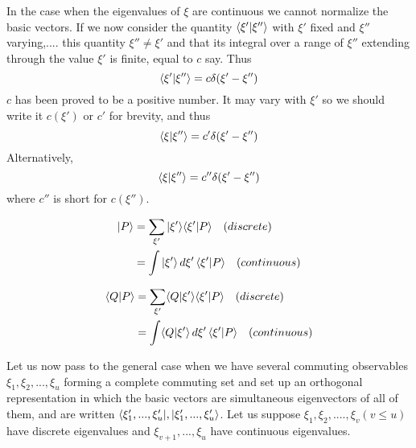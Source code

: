 In the case when the eigenvalues of $\xi$ are continuous we cannot normalize the basic vectors. If we now consider the quantity $\langle \xi' | \xi'' \rangle$ with $\xi'$ fixed and $\xi''$ varying,.... this quantity $\xi'' \neq \xi'$ and that its integral over a range of $\xi''$ extending through the value $\xi'$ is finite, equal to $c$ say. Thus
\begin{equation}
\langle \xi' | \xi'' \rangle=c\delta(\xi' - \xi'')
\end{equation}
$c$ has been proved to be a positive number. It may vary with $\xi'$ so we should write it $c(\xi')$ or $c'$ for brevity, and thus
\begin{equation}
\langle \xi | \xi'' \rangle = c'\delta(\xi'-\xi'')
\end{equation}
Alternatively,
\begin{equation}
\langle \xi | \xi'' \rangle = c''\delta(\xi'-\xi'')
\end{equation}
	where $c''$ is short for $c(\xi'')$.

\begin{align}
| P \rangle &= \sum_{\xi'} | \xi' \rangle \langle \xi' | P \rangle \quad (discrete) \\
&=\int | \xi' \rangle \, d\xi' \, \langle \xi' | P \rangle \quad (continuous)
\end{align}

\begin{align}
\langle Q | P \rangle &= \sum_{\xi'} \langle Q | \xi' \rangle \langle \xi' | P \rangle \quad (discrete) \\
&= \int \langle Q | \xi' \rangle \, d\xi' \, \langle \xi' | P \rangle \quad (continuous)
\end{align}

Let us now pass to the general case when we have several commuting observables $\xi_1,\xi_2,...,\xi_u$ forming a complete commuting set and set up an orthogonal representation in which the basic vectors are simultaneous eigenvectors of all of them, and are written $\langle \xi'_1, ...,\xi'_u |, | \xi'_1, ...,\xi'_u \rangle$. Let us suppose $\xi_1, \xi_2, .... , \xi_v (v \leqslant u)$ have discrete eigenvalues and $\xi_{v+1},...,\xi_u$ have continuous eigenvalues.

